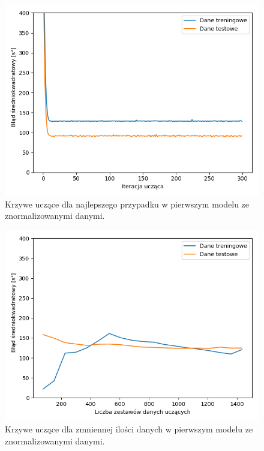 \documentclass[12pt]{aghdpl}
\newenvironment{tightcenter}{
  \setlength\topsep{0pt}
  \setlength\parskip{0pt}
  \begin{center}
}{
  \end{center}
}
\begin{document}
		\begin{figure}[h]
			\begin{tightcenter}
	 			\includegraphics[width = \linewidth]{wykresy/2_normalizacja_danych/wykres_uczenia.png}
	 		\end{tightcenter}
	 		
 			\caption{Krzywe uczące dla najlepszego przypadku w pierwszym modelu ze znormalizowanymi danymi.}
			\label{fig: pierwszy_model_wykres_uczenia_z_normalizacja}
		\end{figure}
		
		\begin{figure}[h]
			\begin{tightcenter}
	 			\includegraphics[width = \linewidth]{wykresy/2_normalizacja_danych/learning_curves.png}
	 		\end{tightcenter}
	 		
 			\caption{Krzywe uczące dla zmniennej ilości danych w pierwszym modelu ze znormalizowanymi danymi.}
			\label{fig: pierwszy_model_learning_curves_z_normalizacja}
		\end{figure}
		
\end{document}
